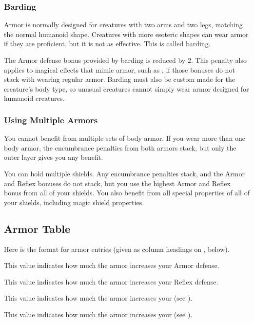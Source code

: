     \subsubsection{Barding}\label{Barding}
      Armor is normally designed for creatures with two arms and two legs, matching the normal humanoid shape.
      Creatures with more esoteric shapes can wear armor if they are proficient, but it is not as effective.
      This is called barding.

      The Armor defense bonus provided by barding is reduced by 2.
      This penalty also applies to magical effects that mimic armor, such as , if those bonuses do not stack with wearing regular armor.
      Barding must also be custom made for the creature's body type, so unusual creatures cannot simply wear armor designed for humanoid creatures.

    \subsubsection{Using Multiple Armors}
      You cannot benefit from multiple sets of body armor.
      If you wear more than one body armor, the encumbrance penalties from both armors stack, but only the outer layer gives you any benefit.

      You can hold multiple shields.
      Any encumbrance penalties stack, and the Armor and Reflex bonuses do not stack, but you use the highest Armor and Reflex bonus from all of your shields.
      You also benefit from all special properties of all of your shields, including magic shield properties.

  \subsection{Armor Table}
    \par Here is the format for armor entries (given as column headings on , below).

     This value indicates how much the armor increases your Armor defense.

     This value indicates how much the armor increases your Reflex defense.

     This value indicates how much the armor increases your  (see ).

     This value indicates how much the armor increases your  (see ).

